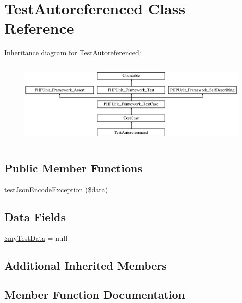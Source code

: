 \hypertarget{class_test_autoreferenced}{}\section{Test\+Autoreferenced Class Reference}
\label{class_test_autoreferenced}
Inheritance diagram for Test\+Autoreferenced\+:\begin{figure}[H]
\begin{center}
\leavevmode
\includegraphics[height=4.129793cm]{class_test_autoreferenced}
\end{center}
\end{figure}
\subsection*{Public Member Functions}
\begin{DoxyCompactItemize}
\item 
\mbox{\hyperlink{class_test_autoreferenced_a4504421f5768ca72d9dcd6329c830be1}{test\+Json\+Encode\+Exception}} (\$data)
\end{DoxyCompactItemize}
\subsection*{Data Fields}
\begin{DoxyCompactItemize}
\item 
\mbox{\hyperlink{class_test_autoreferenced_aa487aa396e41ee589b1b39d5a738e4db}{\$my\+Test\+Data}} = null
\end{DoxyCompactItemize}
\subsection*{Additional Inherited Members}


\subsection{Member Function Documentation}
\mbox{\label{class_test_autoreferenced_a4504421f5768ca72d9dcd6329c830be1}} 
